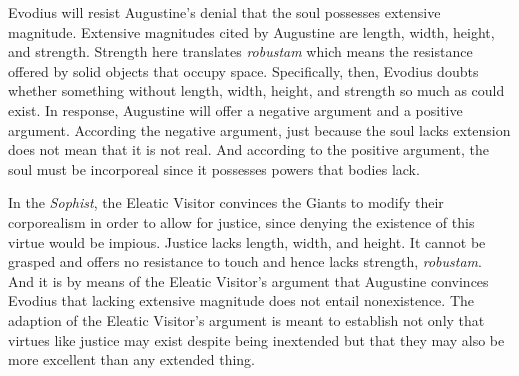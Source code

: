 \documentclass[12pt]{article}
\begin{document}
Evodius will resist Augustine’s denial that the soul possesses extensive magnitude. Extensive magnitudes cited by Augustine are length, width, height, and strength. Strength here translates \emph{robustam} which means the resistance offered by solid objects that occupy space. Specifically, then, Evodius doubts whether something without length, width, height, and strength so much as could exist. 
In response, Augustine will offer a negative argument and a positive argument. According the negative argument, just because the soul lacks extension does not mean that it is not real. And according to the positive argument, the soul must be incorporeal since it possesses powers that bodies lack.

In the \emph{Sophist}, the Eleatic Visitor convinces the Giants to modify their corporealism in order to allow for justice, since denying the existence of this virtue would be impious. Justice lacks length, width, and height. It cannot be grasped and offers no resistance to touch and hence lacks strength, \emph{robustam}. And it is by means of the Eleatic Visitor’s argument that Augustine convinces Evodius that lacking extensive magnitude does not entail nonexistence. The adaption of the Eleatic Visitor’s argument is meant to establish not only that virtues like justice may exist despite being inextended but that they may also be more excellent than any extended thing.
\end{document}

